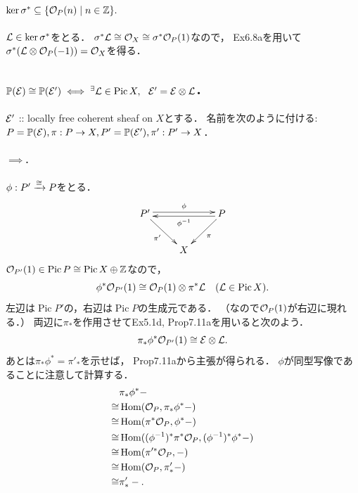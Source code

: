 \documentclass[a4paper]{jsarticle}
\newcommand{\Cl}{\operatorname{Cl}}
\newcommand{\Pic}{\operatorname{Pic}}
\newcommand{\pbundle}{\mathbb{P}}
\begin{document}
    \paragraph{$\ker \sigma^* \subseteq \{ \mathcal{O}_P(n) \mid n \in \mathbb{Z} \}.$}
    $\mathcal{L} \in \ker \sigma^*$をとる．
    $\sigma^* \mathcal{L} \cong \mathcal{O}_X \cong \sigma^* \mathcal{O}_P(1)$なので，
    Ex6.8aを用いて$\sigma^*(\mathcal{L} \otimes \mathcal{O}_P(-1))=\mathcal{O}_X$を得る．



    \subsection{$\pbundle(\shE) \iso \pbundle(\shE') \iff
        \Exists{\shL \in \Pic X} \shE'=\shE \otimes \shL$.}
    $\mathcal{E}'$ :: locally free coherent sheaf on $X$とする．
    名前を次のように付ける:
    $P=\pbundle(\shE), \pi: P \to X, P'=\pbundle(\shE'), \pi': P' \to X$．

    \paragraph{$\implies$.}
    $\phi: P' \xrightarrow{\cong} P$をとる．
    \[
        \xymatrix
        {
            P' \ar@<2pt>[rr]^-{\phi}\ar[rd]_-{\pi'}& {} &\ar@<2pt>[ll]^-{\phi^{-1}} P \ar[ld]^-{\pi} \\
            {} & X & {}
        }
    \]
    $\shO_{P'}(1) \in \Pic P \iso \Pic X \oplus \Z$なので，
    \[ \phi^* \shO_{P'}(1) \iso \shO_P(1) \otimes \pi^* \shL ~~~(\shL \in \Pic X). \]
    左辺は$\Pic P'$の，右辺は$\Pic P$の生成元である．
    （なので$\mathcal{O}_P(1)$が右辺に現れる．）
    両辺に$\pi_*$を作用させてEx5.1d, Prop7.11aを用いると次のよう．
    \[ \pi_*\phi^* \mathcal{O}_{P'}(1) \cong \mathcal{E} \otimes \mathcal{L}. \]
    あとは$\pi_* \phi^*=\pi'_*$を示せば，
    Prop7.11aから主張が得られる．
    $\phi$が同型写像であることに注意して計算する．
    \begin{align*}
        {}&     \pi_* \phi^* - \\
        \cong&   \operatorname{Hom}(\mathcal{O}_{P}, \pi_* \phi^* -) \\
        \cong&   \operatorname{Hom}(\pi^* \mathcal{O}_{P}, \phi^* -) \\
        \cong&   \operatorname{Hom}((\phi^{-1})^*\pi^* \mathcal{O}_{P}, (\phi^{-1})^*\phi^* -) \\
        \cong&   \operatorname{Hom}(\pi'^* \mathcal{O}_{P}, -) \\
        \cong&   \operatorname{Hom}(\mathcal{O}_{P}, \pi'_* -) \\
        \cong&   \pi'_* -.
    \end{align*}
\end{document}
